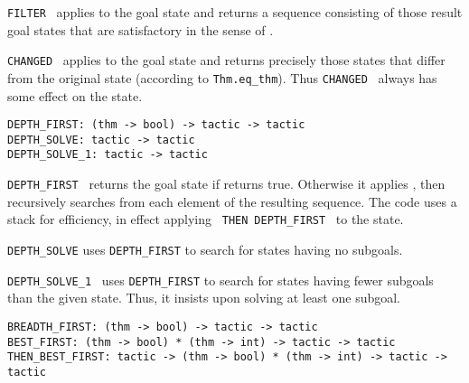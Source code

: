 \begin{isabellebody}
\begin{isamarkuptext}
  \begin{description}

  \item \verb|FILTER|~ applies  to the
  goal state and returns a sequence consisting of those result goal
  states that are satisfactory in the sense of .

  \item \verb|CHANGED|~ applies  to the goal
  state and returns precisely those states that differ from the
  original state (according to \verb|Thm.eq_thm|).  Thus \verb|CHANGED|~ always has some effect on the state.

  \end{description}%
\end{isamarkuptext}%
\isamarkuptrue%
%
\isamarkuptrue%
%
\begin{isamarkuptext}%
\begin{mldecls}
  \verb|DEPTH_FIRST: (thm -> bool) -> tactic -> tactic| \\
  \verb|DEPTH_SOLVE: tactic -> tactic| \\
  \verb|DEPTH_SOLVE_1: tactic -> tactic| \\
  \end{mldecls}

  \begin{description}

  \item \verb|DEPTH_FIRST|~ returns the goal state if
   returns true.  Otherwise it applies ,
  then recursively searches from each element of the resulting
  sequence.  The code uses a stack for efficiency, in effect applying
  ~\verb|THEN|~\verb|DEPTH_FIRST|~ to
  the state.

  \item \verb|DEPTH_SOLVE| uses \verb|DEPTH_FIRST| to
  search for states having no subgoals.

  \item \verb|DEPTH_SOLVE_1|~ uses \verb|DEPTH_FIRST| to
  search for states having fewer subgoals than the given state.  Thus,
  it insists upon solving at least one subgoal.

  \end{description}%
\end{isamarkuptext}%
\isamarkuptrue%
%
\isamarkuptrue%
%
\begin{isamarkuptext}%
\begin{mldecls}
  \verb|BREADTH_FIRST: (thm -> bool) -> tactic -> tactic| \\
  \verb|BEST_FIRST: (thm -> bool) * (thm -> int) -> tactic -> tactic| \\
  \verb|THEN_BEST_FIRST: tactic -> (thm -> bool) * (thm -> int) -> tactic -> tactic| \\
  \end{mldecls}


\end{isamarkuptext}
\end{isabellebody}
